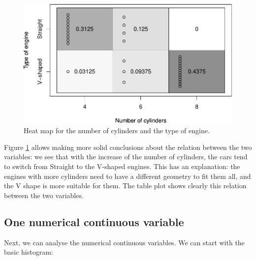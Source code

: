 \documentclass[
]{book}
\newenvironment{Shaded}{\begin{snugshade}}{\end{snugshade}}
\newcommand{\AttributeTok}[1]{\textcolor[rgb]{0.13,0.29,0.53}{#1}}
\newcommand{\ConstantTok}[1]{\textcolor[rgb]{0.56,0.35,0.01}{#1}}
\newcommand{\FunctionTok}[1]{\textcolor[rgb]{0.13,0.29,0.53}{\textbf{#1}}}
\newcommand{\NormalTok}[1]{#1}
\newcommand{\SpecialCharTok}[1]{\textcolor[rgb]{0.81,0.36,0.00}{\textbf{#1}}}
\newcommand{\StringTok}[1]{\textcolor[rgb]{0.31,0.60,0.02}{#1}}
\theoremstyle{definition}
\theoremstyle{definition}
\theoremstyle{definition}
\theoremstyle{definition}
\theoremstyle{remark}
\begin{document}
\begin{figure}
\centering
\includegraphics{Svetunkov---Statistics-for-Business-Analytics_files/figure-latex/tableplotCYLVS-1.pdf}
\caption{\label{fig:tableplotCYLVS}Heat map for the number of cylinders and the type of engine.}
\end{figure}

Figure \ref{fig:tableplotCYLVS} allows making more solid conclusions about the relation between the two variables: we see that with the increase of the number of cylinders, the cars tend to switch from Straight to the V-shaped engines. This has an explanation: the engines with more cylinders need to have a different geometry to fit them all, and the V shape is more suitable for them. The table plot shows clearly this relation between the two variables.

\subsection{One numerical continuous variable}\label{one-numerical-continuous-variable}

Next, we can analyse the numerical continuous variables. We can start with the basic histogram:

\begin{Shaded}
\end{Shaded}
\end{document}
